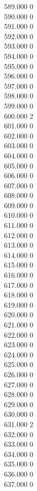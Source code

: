{ 589.000	0 \\
 590.000	0 \\
 591.000	0 \\
 592.000	0 \\
 593.000	0 \\
 594.000	0 \\
 595.000	0 \\
 596.000	0 \\
 597.000	0 \\
 598.000	0 \\
 599.000	0 \\
 600.000	2 \\
 601.000	0 \\
 602.000	0 \\
 603.000	0 \\
 604.000	0 \\
 605.000	0 \\
 606.000	0 \\
 607.000	0 \\
 608.000	0 \\
 609.000	0 \\
 610.000	0 \\
 611.000	0 \\
 612.000	0 \\
 613.000	0 \\
 614.000	0 \\
 615.000	0 \\
 616.000	0 \\
 617.000	0 \\
 618.000	0 \\
 619.000	0 \\
 620.000	0 \\
 621.000	0 \\
 622.000	0 \\
 623.000	0 \\
 624.000	0 \\
 625.000	0 \\
 626.000	0 \\
 627.000	0 \\
 628.000	0 \\
 629.000	0 \\
 630.000	0 \\
 631.000	2 \\
 632.000	0 \\
 633.000	0 \\
 634.000	0 \\
 635.000	0 \\
 636.000	0 \\
 637.000	0 \\
}
